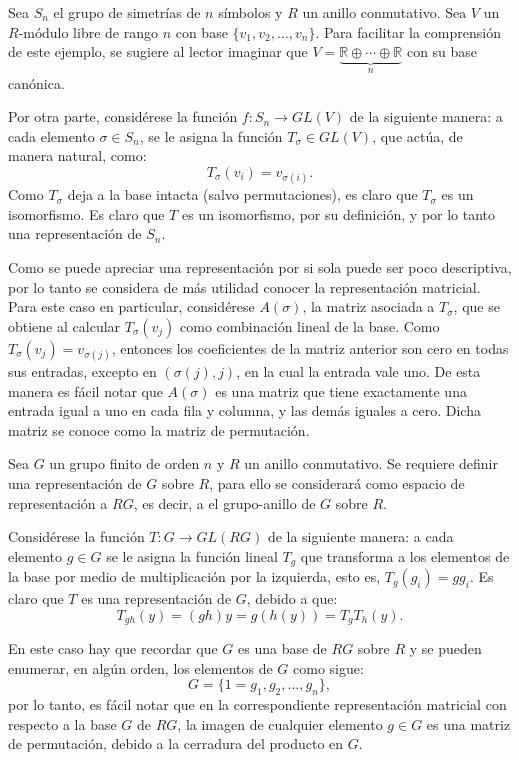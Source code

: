 \begin{ejemplo}
Sea $S_n$ el grupo de simetrías de $n$ símbolos y $R$ un anillo conmutativo. Sea $V$ un $R\mbox{-módulo}$ libre de rango $n$ con base $\{v_1, v_2, \dots, v_n\}$. Para facilitar la comprensión de este ejemplo, se sugiere al lector imaginar que $V = \underset{n}{\underbrace{\mathds{R} \oplus \cdots \oplus \mathds{R}}}$ con su base canónica. 

Por otra parte, considérese la función $f \colon S_n \to GL(V)$ de la siguiente manera: a cada elemento $\sigma 
\in S_n$, se le asigna la función $T_{\sigma} \in GL(V)$, que actúa, de manera natural, como:
\[T_{\sigma}(v_i) = v_{\sigma(i)}.\]
\indent Como $T_{\sigma}$ deja a la base intacta (salvo permutaciones), es claro que $T_\sigma$ es un isomorfismo. Es claro que $T$ es un isomorfismo, por su definición, y por lo tanto una representación de $S_n$.

Como se puede apreciar una representación por si sola puede ser poco descriptiva, por lo tanto se considera de más utilidad conocer la representación matricial. Para este caso en particular, considérese $A(\sigma)$, la matriz asociada a $T_{\sigma}$, que se obtiene al calcular $T_{\sigma}(v_j)$ como combinación lineal de la base. Como $T_{\sigma} (v_j) = v_{\sigma(j)}$, entonces los coeficientes de la matriz anterior son cero en todas sus entradas, excepto en $(\sigma(j),j)$, en la cual la entrada vale uno. De esta manera es fácil notar que $A(\sigma)$ es una matriz que tiene exactamente una entrada igual a uno en cada fila y columna, y las demás iguales a cero. Dicha matriz se conoce como la matriz de permutación.
\end{ejemplo}
\begin{ejemplo}
Sea $G$ un grupo finito de orden $n$ y $R$ un anillo conmutativo. Se requiere definir una representación de $G$ sobre $R$, para ello se considerará  como espacio de representación a $RG$, es decir, a el grupo-anillo de $G$ sobre $R$. 

Considérese la función $T \colon G \to GL(RG)$ de la siguiente manera: a cada elemento $g \in G$ se le asigna la función lineal $T_g$ que transforma a los elementos de la base por medio de multiplicación por la izquierda, esto es, $T_g(g_i) = gg_i$. Es claro que $T$ es una representación de $G$, debido a que:
\begin{equation*} T_{gh}(y) = (gh)y = g(h(y)) = T_gT_h(y).  \end{equation*}

 
En este caso hay que recordar que $G$ es una base de $RG$ sobre $R$ y se pueden enumerar, en algún orden, los elementos de $G$ como sigue:
\begin{equation*} 
G = \{ 1=g_1, g_2, \dots, g_n \}, 
\end{equation*}  por lo tanto, es fácil notar que en la correspondiente representación matricial con respecto a la base $G$ de $RG$, la imagen de cualquier elemento $g \in G$ es una matriz de permutación, debido a la cerradura del producto en $G$. 
\end{ejemplo}
